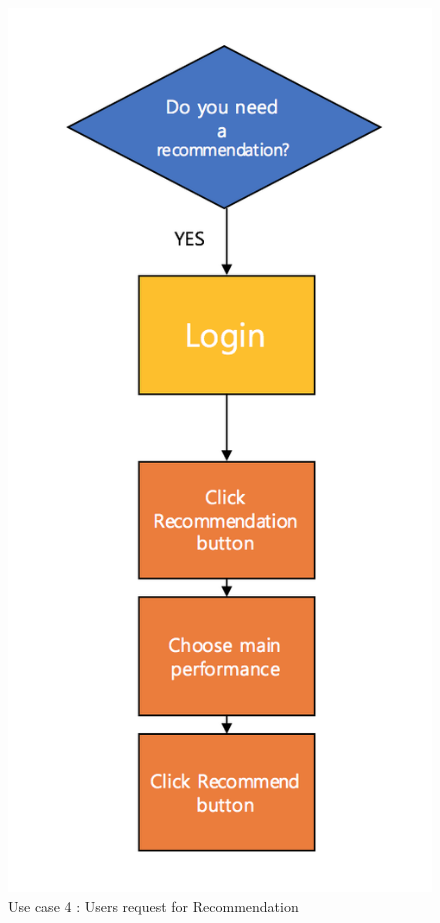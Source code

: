 \documentclass[conference]{IEEEtran}
\begin{document}
\begin{figure}[H]
\begin{center}
    \includegraphics[scale=0.8]{usecase4}
    \caption{Use case 4 : Users request for Recommendation} \label{fig:label}
\end{center}
\end{figure}
\end{document}
